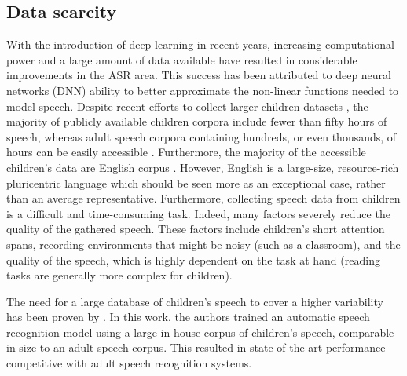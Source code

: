 \subsection{Data scarcity}%
\label{section:data_scarcity}
With the introduction of deep learning in recent years, increasing computational power and a large amount of data available have resulted in considerable improvements in the ASR area. This success has been attributed to deep neural networks (DNN) ability to better approximate the non-linear functions needed to model speech.
Despite recent efforts to collect larger children datasets \cite{MyST,singakids,ahmed2021auskidtalk}, the majority of publicly available children corpora include fewer than fifty hours of speech, whereas adult speech corpora containing hundreds, or even thousands, of hours can be easily accessible \cite{librispeech}. Furthermore, the majority of the accessible children's data are English corpus \cite{MyST,cmu,cslu,pf-star-british,ahmed2021auskidtalk}. However, English is a large-size, resource-rich pluricentric language which should be seen more as an exceptional case, rather than an average representative.
Furthermore, collecting speech data from children is a difficult and time-consuming task. Indeed, many factors severely reduce the quality of the gathered speech. These factors include children's short attention spans, recording environments that might be noisy (such as a classroom), and the quality of the speech, which is highly dependent on the task at hand (reading tasks are generally more complex for children).

The need for a large database of children's speech to cover a higher variability has been proven by \cite{asr-google}.  In this work, the authors trained an automatic speech recognition model using a large in-house corpus of children's speech, comparable in size to an adult speech corpus. This resulted in state-of-the-art performance competitive with adult speech recognition systems.


